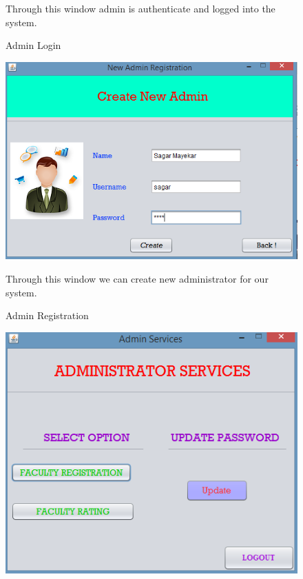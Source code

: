 \documentclass[12 pt,a4paper]{report}
\begin{document}
\begin{center}
\begin{figure}[ht]
\begin{center}
\caption{Admin Login}
\vspace{0.2 cm}
\justify
{Through this window admin is authenticate and logged into the system.}
\end{center}
\end{figure}
\begin{figure}[ht]
\begin{center}
\includegraphics[scale=.7]{adminreg.png}\\
\caption{Admin Registration}
\vspace{0.2 cm}
\justify
{Through this window we can create new administrator for our system.}
\end{center}
\end{figure}
\begin{figure}[ht]
\begin{center}
\includegraphics[scale=.7]{adminservice.png}\\

\end{center}
\end{figure}
\end{center}
\end{document}

